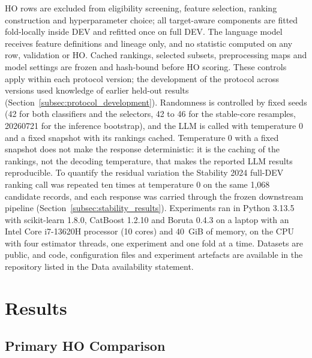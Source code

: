 \documentclass[final,5p,twocolumn]{elsarticle}
\begin{document}
HO rows are excluded from eligibility screening, feature selection, ranking construction and hyperparameter choice; all target-aware components are fitted fold-locally inside DEV and refitted once on full DEV. The language model receives feature definitions and lineage only, and no statistic computed on any row, validation or HO. Cached rankings, selected subsets, preprocessing maps and model settings are frozen and hash-bound before HO scoring. These controls apply within each protocol version; the development of the protocol across versions used knowledge of earlier held-out results (Section~\ref{subsec:protocol_development}). Randomness is controlled by fixed seeds (42 for both classifiers and the selectors, 42 to 46 for the stable-core resamples, 20260721 for the inference bootstrap), and the LLM is called with temperature 0 and a fixed snapshot with its rankings cached. Temperature 0 with a fixed snapshot does not make the response deterministic: it is the caching of the rankings, not the decoding temperature, that makes the reported LLM results reproducible. To quantify the residual variation the Stability 2024 full-DEV ranking call was repeated ten times at temperature 0 on the same 1,068 candidate records, and each response was carried through the frozen downstream pipeline (Section~\ref{subsec:stability_results}). Experiments ran in Python 3.13.5 with scikit-learn 1.8.0, CatBoost 1.2.10 and Boruta 0.4.3 on a laptop with an Intel Core i7-13620H processor (10 cores) and 40~GiB of memory, on the CPU with four estimator threads, one experiment and one fold at a time. Datasets are public, and code, configuration files and experiment artefacts are available in the repository listed in the Data availability statement.


\section{Results}
\label{sec:results}

\subsection{Primary HO Comparison}
\label{subsec:primary_results}
\end{document}
